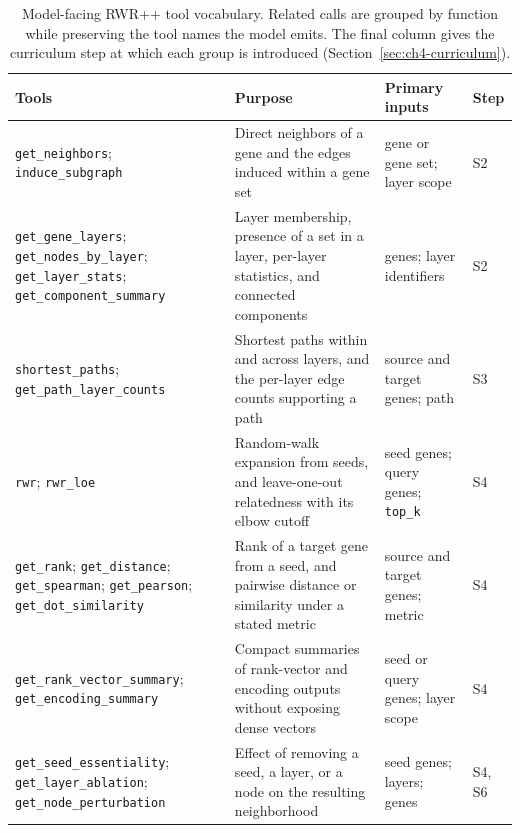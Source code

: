 \documentclass[thesis,letterpaper,12pt]{utthesis}
\begin{document}
\begin{table}[htb!]
\centering
\caption[Model-facing RWR++ tool vocabulary]{Model-facing RWR++ tool vocabulary. Related calls are grouped by function while preserving the tool names the model emits. The final column gives the curriculum step at which each group is introduced (Section~\ref{sec:ch4-curriculum}).}
\label{tab:ch4-tools}
\footnotesize
\setlength{\tabcolsep}{4pt}
\renewcommand{\arraystretch}{1.1}
\begin{tabularx}{\textwidth}{@{}>{\raggedright\arraybackslash}p{} Y >{\raggedright\arraybackslash}p{0.175\textwidth} >{\centering\arraybackslash}p{0.055\textwidth}@{}}
\toprule
\textbf{Tools} & \textbf{Purpose} & \textbf{Primary inputs} & \textbf{Step} \\
\midrule
\texttt{get\_neighbors}; \texttt{induce\_subgraph}
  & Direct neighbors of a gene and the edges induced within a gene set
  & gene or gene set; layer scope & S2 \\
\addlinespace
\texttt{get\_gene\_layers}; \texttt{get\_nodes\_by\_layer}; \texttt{get\_layer\_stats}; \texttt{get\_component\_summary}
  & Layer membership, presence of a set in a layer, per-layer statistics, and connected components
  & genes; layer identifiers & S2 \\
\addlinespace
\texttt{shortest\_paths}; \texttt{get\_path\_layer\_counts}
  & Shortest paths within and across layers, and the per-layer edge counts supporting a path
  & source and target genes; path & S3 \\
\addlinespace
\texttt{rwr}; \texttt{rwr\_loe}
  & Random-walk expansion from seeds, and leave-one-out relatedness with its elbow cutoff
  & seed genes; query genes; \texttt{top\_k} & S4 \\
\addlinespace
\texttt{get\_rank}; \texttt{get\_distance}; \texttt{get\_spearman}; \texttt{get\_pearson}; \texttt{get\_dot\_similarity}
  & Rank of a target gene from a seed, and pairwise distance or similarity under a stated metric
  & source and target genes; metric & S4 \\
\addlinespace
\texttt{get\_rank\_vector\_summary}; \texttt{get\_encoding\_summary}
  & Compact summaries of rank-vector and encoding outputs without exposing dense vectors
  & seed or query genes; layer scope & S4 \\
\addlinespace
\texttt{get\_seed\_essentiality}; \texttt{get\_layer\_ablation}; \texttt{get\_node\_perturbation}
  & Effect of removing a seed, a layer, or a node on the resulting neighborhood
  & seed genes; layers; genes & S4, S6 \\

\end{tabularx}
\end{table}
\end{document}
